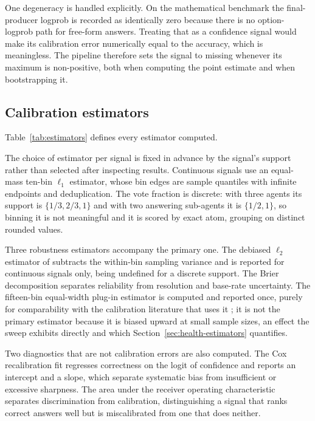 One degeneracy is handled explicitly. On the mathematical benchmark the final-producer
logprob is recorded as identically zero because there is no option-logprob path for
free-form answers. Treating that as a confidence signal would make its calibration error
numerically equal to the accuracy, which is meaningless. The pipeline therefore sets the
signal to missing whenever its maximum is non-positive, both when computing the point
estimate and when bootstrapping it.

\subsection{Calibration estimators}

Table~\ref{tab:estimators} defines every estimator computed.


The choice of estimator per signal is fixed in advance by the signal's support rather than
selected after inspecting results. Continuous signals use an equal-mass ten-bin
$\ell_1$ estimator, whose bin edges are sample quantiles with infinite endpoints and
deduplication. The vote fraction is discrete: with three agents its support is
$\{1/3, 2/3, 1\}$ and with two answering sub-agents it is $\{1/2, 1\}$, so binning it is
not meaningful and it is scored by exact atom, grouping on distinct rounded values.

Three robustness estimators accompany the primary one. The debiased $\ell_2$ estimator of
\citet{kumar2019verified} subtracts the within-bin sampling variance and is reported for
continuous signals only, being undefined for a discrete support. The Brier decomposition
\citep{murphy1973} separates reliability from resolution and base-rate uncertainty. The
fifteen-bin equal-width plug-in estimator is computed and reported once, purely for
comparability with the calibration literature that uses it \citep{guo2017calibration};
it is not the primary estimator because it is biased upward at small sample sizes, an
effect the sweep exhibits directly and which Section~\ref{sec:health-estimators}
quantifies.

Two diagnostics that are not calibration errors are also computed. The Cox recalibration
fit \citep{cox1958} regresses correctness on the logit of confidence and reports an
intercept and a slope, which separate systematic bias from insufficient or excessive
sharpness. The area under the receiver operating characteristic separates discrimination
from calibration, distinguishing a signal that ranks correct answers well but is
miscalibrated from one that does neither.

